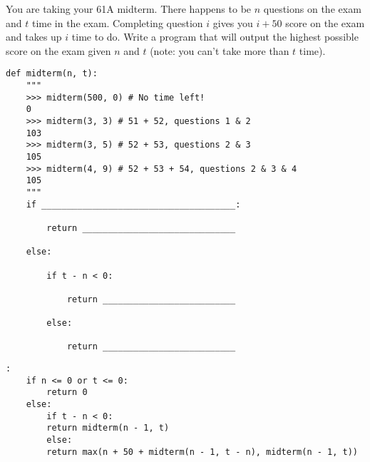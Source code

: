 \begin{blocksection}
\question You are taking your 61A midterm. There happens to be $n$ questions on the exam and $t$ time in the exam. Completing question $i$ gives you $i + 50$ score on the exam and takes up $i$ time to do. Write a program that will output the highest possible score on the exam given $n$ and $t$ (note: you can't take more than $t$ time). \\

\begin{lstlisting}
def midterm(n, t):
    """
    >>> midterm(500, 0) # No time left!
    0 
    >>> midterm(3, 3) # 51 + 52, questions 1 & 2
    103
    >>> midterm(3, 5) # 52 + 53, questions 2 & 3
    105 
    >>> midterm(4, 9) # 52 + 53 + 54, questions 2 & 3 & 4
    105
    """		
    if ______________________________________:		

        return ______________________________	

    else:

        if t - n < 0:	

            return __________________________	

        else:

            return __________________________
\end{lstlisting}

\begin{solution}[1in]
\begin{lstlisting}:
    if n <= 0 or t <= 0:
        return 0
    else:
        if t - n < 0:
	    return midterm(n - 1, t)
        else:
	    return max(n + 50 + midterm(n - 1, t - n), midterm(n - 1, t))
\end{lstlisting}
\end{solution}
\end{blocksection}
